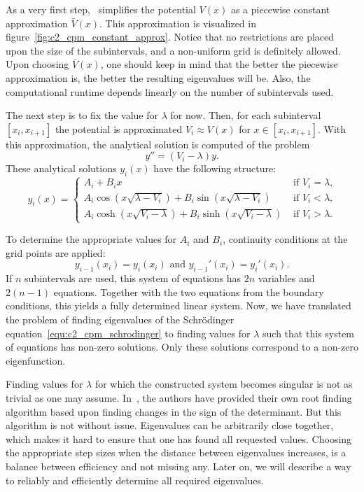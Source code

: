 As a very first step,~\cite{canosa_new_1970} simplifies the potential $V(x)$ as a piecewise constant approximation $\bar{V}(x)$. This approximation is visualized in figure~\ref{fig:c2_cpm_constant_approx}. Notice that no restrictions are placed upon the size of the subintervals, and a non-uniform grid is definitely allowed. Upon choosing $\bar{V}(x)$, one should keep in mind that the better the piecewise approximation is, the better the resulting eigenvalues will be. Also, the computational runtime depends linearly on the number of subintervals used.

The next step is to fix the value for $\lambda$ for now. Then, for each subinterval $[x_i, x_{i+1}]$ the potential is approximated $V_i \approx V(x)$ for $x \in [x_i, x_{i+1}]$. With this approximation, the analytical solution is computed of the problem
$$
    y'' = (V_i - \lambda) y\text{.}
$$
These analytical solutions $y_i(x)$ have the following structure:
$$
    y_i(x) = \begin{cases}
        A_i + B_i x                                                         & \text{ if $V_i = \lambda$,} \\
        A_i \cos(x\sqrt{\lambda - V_i}) + B_i \sin(x\sqrt{\lambda - V_i})   & \text{ if $V_i < \lambda$,} \\
        A_i \cosh(x\sqrt{V_i - \lambda}) + B_i \sinh(x\sqrt{V_i - \lambda}) & \text{ if $V_i > \lambda$.}
    \end{cases}
$$

To determine the appropriate values for $A_i$ and $B_i$, continuity conditions at the grid points are applied:
$$
    y_{i-1}(x_i) = y_{i}(x_i) \text{ and } y_{i-1}'(x_i) = y_{i}'(x_i) \text{.}
$$
If $n$ subintervals are used, this system of equations has $2n$ variables and $2(n-1)$ equations. Together with the two equations from the boundary conditions, this yields a fully determined linear system. Now, we have translated the problem of finding eigenvalues of the Schrödinger equation~\eqref{equ:c2_cpm_schrodinger} to finding values for $\lambda$ such that this system of equations has non-zero solutions. Only these solutions correspond to a non-zero eigenfunction.

Finding values for $\lambda$ for which the constructed system becomes singular is not as trivial as one may assume. In~\cite{canosa_new_1970}, the authors have provided their own root finding algorithm based upon finding changes in the sign of the determinant. But this algorithm is not without issue. Eigenvalues can be arbitrarily close together, which makes it hard to ensure that one has found all requested values. Choosing the appropriate step sizes when the distance between eigenvalues increases, is a balance between efficiency and not missing any. Later on, we will describe a way to reliably and efficiently determine all required eigenvalues.

